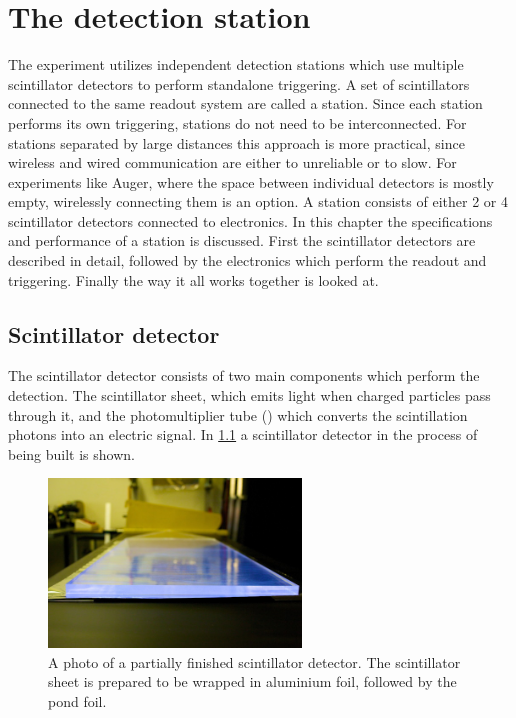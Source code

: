 \setcounter{chapter}{1}
\chapter{The \hisparc detection station}

The \hisparc experiment utilizes independent detection stations which use multiple scintillator detectors to perform standalone triggering. A set of scintillators connected to the same readout system are called a station. Since each station performs its own triggering, stations do not need to be interconnected. For stations separated by large distances this approach is more practical, since wireless and wired communication are either to unreliable or to slow. For experiments like Auger, where the space between individual detectors is mostly empty, wirelessly connecting them is an option. A \hisparc station consists of either 2 or 4 scintillator detectors connected to \hisparc electronics. In this chapter the specifications and performance of a station is discussed. First the scintillator detectors are described in detail, followed by the electronics which perform the readout and triggering. Finally the way it all works together is looked at.



\section{Scintillator detector}

The scintillator detector consists of two main components which perform the detection. The scintillator sheet, which emits light when charged particles pass through it, and the photomultiplier tube (\pmt) which converts the scintillation photons into an electric signal. In \cref{fig:scintillator_detector} a scintillator detector in the process of being built is shown.

\begin{figure}
    \centering
    \includegraphics[width=0.6\textwidth]
                    {plots/station/ADL_115651.jpg}
    \caption{A photo of a partially finished scintillator detector. The scintillator sheet is prepared to be wrapped in aluminium foil, followed by the pond foil.}
    \label{fig:scintillator_detector}
\end{figure}


